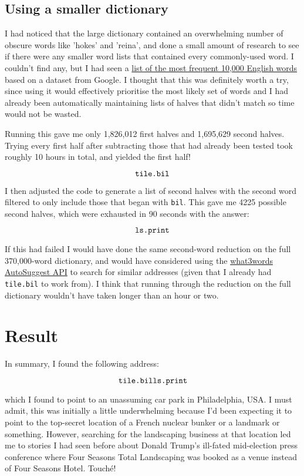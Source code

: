 \documentclass[11pt]{article} %
\begin{document}
\subsection{Using a smaller dictionary}

I had noticed that the large dictionary contained an overwhelming number of obscure words like 'hokes' and 'reina', and done a small amount of research to see if there were any smaller word lists that contained every commonly-used word. I couldn't find any, but I had seen a \href{https://github.com/first20hours/google-10000-english/blob/master/google-10000-english-no-swears.txt}{list of the most frequent 10,000 English words} based on a dataset from Google. I thought that this was definitely worth a try, since using it would effectively prioritise the most likely set of words and I had already been automatically maintaining lists of halves that didn't match so time would not be wasted.

Running this gave me only 1,826,012 first halves and 1,695,629 second halves. Trying every first half after subtracting those that had already been tested took roughly 10 hours in total, and yielded the first half!

$$
\verb|tile.bil|
$$

I then adjusted the code to generate a list of second halves with the second word filtered to only include those that began with \verb|bil|. This gave me 4225 possible second halves, which were exhausted in 90 seconds with the answer:

$$
\verb|ls.print|
$$

If this had failed I would have done the same second-word reduction on the full 370,000-word dictionary, and would have considered using the \href{https://developer.what3words.com/tutorial/python}{what3words AutoSuggest API} to search for similar addresses (given that I already had \verb|tile.bil| to work from). I think that running through the reduction on the full dictionary wouldn't have taken longer than an hour or two.

\section{Result}

In summary, I found the following address:

$$
\verb|tile.bills.print|
$$

which I found to point to an unassuming car park in Philadelphia, USA. I must admit, this was initially a little underwhelming because I'd been expecting it to point to the top-secret location of a French nuclear bunker or a landmark or something. However, searching for the landscaping business at that location led me to stories I had seen before about Donald Trump's ill-fated mid-election press conference where Four Seasons Total Landscaping was booked as a venue instead of Four Seasons Hotel. Touché!
\end{document}
